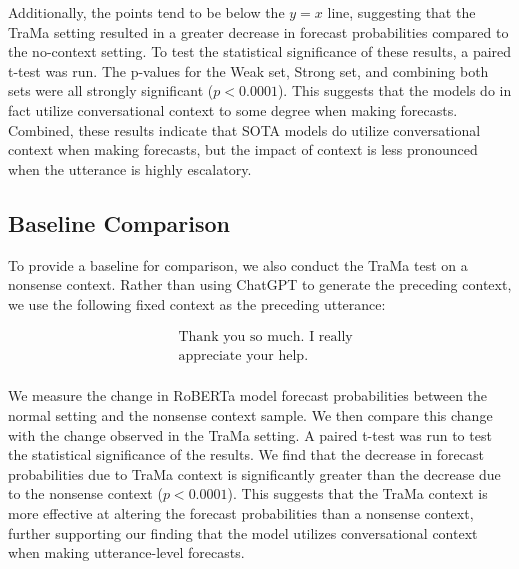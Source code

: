 Additionally, the points tend to be below the $y=x$ line, suggesting that the TraMa setting resulted in a greater decrease in forecast probabilities compared to the no-context setting. 
To test the statistical significance of these results, a paired t-test was run.
The p-values for the Weak set, Strong set, and combining both sets were all strongly significant ($p < 0.0001$). 
This suggests that the models do in fact utilize conversational context to some degree when making forecasts. 
Combined, these results indicate that SOTA models do utilize conversational context when making forecasts, but the impact of context is less pronounced when the utterance is highly escalatory.

\subsection{Baseline Comparison}
To provide a baseline for comparison, we also conduct the TraMa test on a nonsense context.
Rather than using ChatGPT to generate the preceding context, we use the following fixed context as the preceding utterance: 

{\ttfamily
\begin{align*}
& \text{Thank you so much. I really}\\
& \text{appreciate your help.}\\
\end{align*}
}

We measure the change in RoBERTa model forecast probabilities between the normal setting and the nonsense context sample.
We then compare this change with the change observed in the TraMa setting. 
A paired t-test was run to test the statistical significance of the results.
We find that the decrease in forecast probabilities due to TraMa context is significantly greater than the decrease due to the nonsense context ($p < 0.0001$).
This suggests that the TraMa context is more effective at altering the forecast probabilities than a nonsense context, further supporting our finding that the model utilizes conversational context when making utterance-level forecasts.
